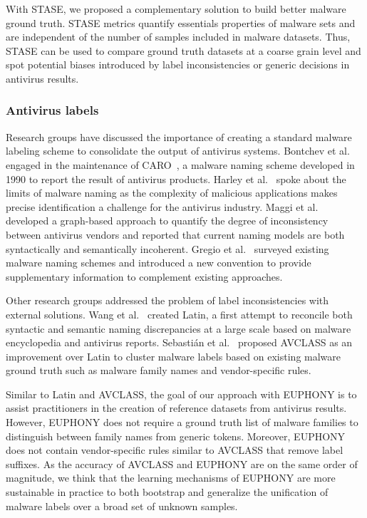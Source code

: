 With STASE, we proposed a complementary solution to build better malware ground truth.
STASE metrics quantify essentials properties of malware sets and are independent of the number of samples included in malware datasets.
Thus, STASE can be used to compare ground truth datasets at a coarse grain level and spot potential biases introduced by label inconsistencies or generic decisions in antivirus results.
\subsubsection{Antivirus labels}
Research groups have discussed the importance of creating a standard malware labeling scheme to consolidate the output of antivirus systems.
Bontchev et al.~\cite{bontchev_current_2005} engaged in the maintenance of CARO~\cite{skulason_caro_nodate}, a malware naming scheme developed in 1990 to report the result of antivirus products.
Harley et al.~\cite{harley_game_2009} spoke about the limits of malware naming as the complexity of malicious applications makes precise identification a challenge for the antivirus industry.
Maggi et al.~\cite{jajodia_finding_2011} developed a graph-based approach to quantify the degree of inconsistency between antivirus vendors and reported that current naming models are both syntactically and semantically incoherent.
Gregio et al.~\cite{gregio_toward_2015} surveyed existing malware naming schemes and introduced a new convention to provide supplementary information to complement existing approaches.

Other research groups addressed the problem of label inconsistencies with external solutions.
Wang et al.~\cite{wang_rebuilding_2014} created Latin, a first attempt to reconcile both syntactic and semantic naming discrepancies at a large scale based on malware encyclopedia and antivirus reports.
Sebastián et al.~\cite{monrose_avclass:_2016} proposed AVCLASS as an improvement over Latin to cluster malware labels based on existing malware ground truth such as malware family names and vendor-specific rules.

Similar to Latin and AVCLASS, the goal of our approach with EUPHONY is to assist practitioners in the creation of reference datasets from antivirus results.
However, EUPHONY does not require a ground truth list of malware families to distinguish between family names from generic tokens.
Moreover, EUPHONY does not contain vendor-specific rules similar to AVCLASS that remove label suffixes.
As the accuracy of AVCLASS and EUPHONY are on the same order of magnitude, we think that the learning mechanisms of EUPHONY are more sustainable in practice to both bootstrap and generalize the unification of malware labels over a broad set of unknown samples.
